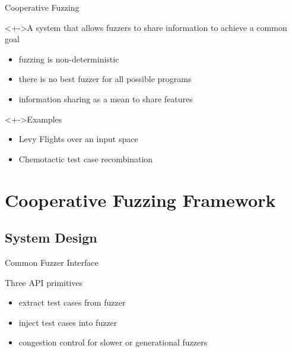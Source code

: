 \documentclass[\HandoutMode,table]{beamer}
\begin{document}
\begin{frame}{Cooperative Fuzzing}
    \begin{block}<+->{A system that allows fuzzers to share information to achieve a common goal}
        \begin{itemize}
            \item{} fuzzing is non-deterministic
            \item{} there is no best fuzzer for all possible programs
            \item{} information sharing as a mean to share features
        \end{itemize}
    \end{block}
    \begin{exampleblock}<+->{Examples}
        \begin{itemize}
            \item{} Levy Flights over an input space
            \item{} Chemotactic test case recombination
        \end{itemize}
    \end{exampleblock}
\end{frame}

\section{Cooperative Fuzzing Framework}

\subsection{System Design}

\begin{frame}{Common Fuzzer Interface}
    \begin{block}{Three API primitives}
        \begin{itemize}[<+->]
            \item{} \alert{extract} test cases from fuzzer
            \item{} \alert{inject} test cases into fuzzer
            \item{} \alert{congestion control} for slower or generational
                fuzzers
        \end{itemize}
    \end{block}
\end{frame}
\end{document}
